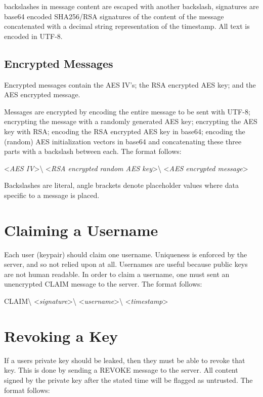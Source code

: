 backslashes in message content are escaped with another backslash, signatures
are base64 encoded SHA256/RSA signatures of the content of the message
concatenated with a decimal string representation of the timestamp. All text is
encoded in UTF-8.


\subsection{Encrypted Messages}
Encrypted messages contain the AES IV's; the RSA encrypted AES key; and the AES
encrypted message.

Messages are encrypted by encoding the entire message to be sent with UTF-8;
encrypting the message with a randomly generated AES key; encrypting the AES key
with RSA; encoding the RSA encrypted AES key in base64; encoding the (random)
AES initialization vectors in base64 and concatenating these three parts with a
backslash between each. The format follows:

\begin{center}
\textless \textit{AES IV}\textgreater\textbackslash
\textless \textit{RSA encrypted random AES key}\textgreater\textbackslash
\textless \textit{AES encrypted message}\textgreater
\end{center}

Backslashes are literal, angle brackets denote placeholder values where data
specific to a message is placed.


\section{Claiming a Username}
Each user (keypair) should claim one username. Uniqueness is enforced by the
server, and so not relied upon at all. Usernames are useful because public keys
are not human readable. In order to claim a username, one must sent an
unencrypted CLAIM message to the server. The format follows:

\begin{center}
CLAIM\textbackslash
\textless \textit{signature}\textgreater\textbackslash
\textless \textit{username}\textgreater\textbackslash
\textless \textit{timestamp}\textgreater
\end{center}

\section{Revoking a Key}
If a users private key should be leaked, then they must be able to revoke that
key. This is done by sending a REVOKE message to the server. All content signed
by the private key after the stated time will be flagged as untrusted. The
format follows:

